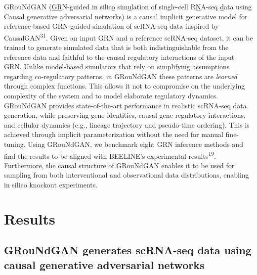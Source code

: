 GRouNdGAN (\underline{GR}N-guided in silic\underline{o} sim\underline{u}lation of single-cell R\underline{N}A-seq \underline{d}ata using Causal generative \underline{a}dversarial \underline{n}etworks) is a causal implicit generative model for reference-based GRN-guided simulation of scRNA-seq data inspired by CausalGAN\textsuperscript{31}. Given an input GRN and a reference scRNA-seq dataset, it can be trained to generate simulated data that is both indistinguishable from the reference data and faithful to the causal regulatory interactions of the input GRN. Unlike model-based simulators that rely on simplifying assumptions regarding co-regulatory patterns, in GRouNdGAN these patterns are \textit{learned} through complex functions. This allows it not to compromise on the underlying complexity of the system and to model elaborate regulatory dynamics. GRouNdGAN provides state-of-the-art performance in realistic scRNA-seq data generation, while preserving gene identities, causal gene regulatory interactions, and cellular dynamics (e.g., lineage trajectory and pseudo-time ordering). This is achieved through implicit parameterization without the need for manual fine-tuning. Using GRouNdGAN, we benchmark eight GRN inference methods and find the results to be aligned with BEELINE’s experimental results\textsuperscript{19}. Furthermore, the causal structure of GRouNdGAN enables it to be used for sampling from both interventional and observational data distributions, enabling in silico knockout experiments.

\section*{Results}
\label{sec:groundgan:results}

\subsection*{GRouNdGAN generates scRNA-seq data using causal generative adversarial networks}

